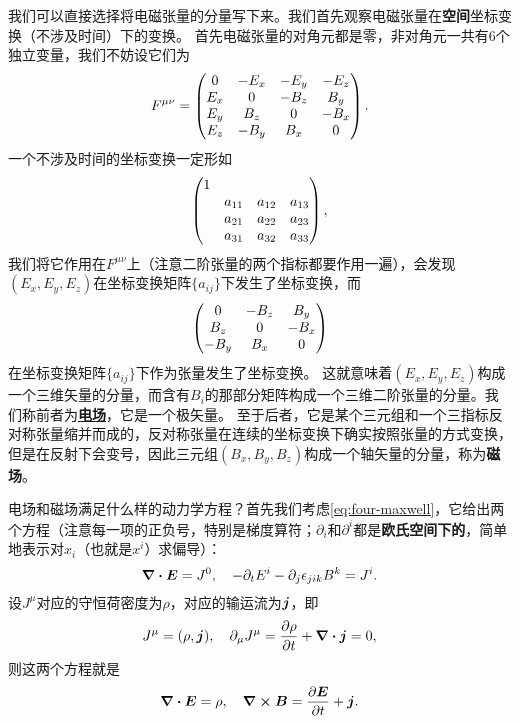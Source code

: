 \documentclass[UTF8, a4paper]{ctexart}
\renewcommand{\emph}[1]{\textbf{#1}}
\newcommand*{\concept}[1]{\underline{\textbf{#1}}}
\begin{document}
我们可以直接选择将电磁张量的分量写下来。我们首先观察电磁张量在\emph{空间}坐标变换（不涉及时间）下的变换。
首先电磁张量的对角元都是零，非对角元一共有$6$个独立变量，我们不妨设它们为
\[
    F^{\mu \nu} = \pmqty{
        0 & -E_x & -E_y & -E_z \\
        E_x & 0 & -B_z & B_y \\
        E_y & B_z & 0 & -B_x \\
        E_z & -B_y & B_x & 0
    }.
\]
一个不涉及时间的坐标变换一定形如
\[
    \pmqty{\dmat{1, \xmat*{a}{3}{3} }},
\]
我们将它作用在$F^{\mu \nu}$上（注意二阶张量的两个指标都要作用一遍），会发现$(E_x, E_y, E_z)$在坐标变换矩阵$\{a_{ij}\}$下发生了坐标变换，而
\[
    \pmqty{
        0 & -B_z & B_y \\
        B_z & 0 & -B_x \\
        -B_y & B_x & 0
    }
\]
在坐标变换矩阵$\{a_{ij}\}$下作为张量发生了坐标变换。
这就意味着$(E_x, E_y, E_z)$构成一个三维矢量的分量，而含有$B_i$的那部分矩阵构成一个三维二阶张量的分量。我们称前者为\concept{电场}，它是一个极矢量。
至于后者，它是某个三元组和一个三指标反对称张量缩并而成的，反对称张量在连续的坐标变换下确实按照张量的方式变换，但是在反射下会变号，因此三元组$(B_x, B_y, B_z)$构成一个轴矢量的分量，称为\textbf{磁场}。

电场和磁场满足什么样的动力学方程？首先我们考虑\eqref{eq:four-maxwell}，它给出两个方程（注意每一项的正负号，特别是梯度算符；$\partial_i$和$\partial^i$都是\emph{欧氏空间下的}，简单地表示对$x_i$（也就是$x^i$）求偏导）：
\[
    \div{\vb*{E}} = J^0, \quad - \partial_t E^i - \partial_j \epsilon_{jik} B^k = J^i.
\]
设$J^\mu$对应的守恒荷密度为$\rho$，对应的输运流为$\vb*{j}$，即
\begin{equation}
    J^\mu = (\rho, \vb*{j}), \quad \partial_\mu J^\mu = \pdv{\rho}{t} + \div{\vb*{j}} = 0,
\end{equation}
则这两个方程就是
\begin{equation}
    \div{\vb*{E}} = \rho, \quad \curl{\vb*{B}} = \pdv{\vb*{E}}{t} + \vb*{j}.
    \label{eq:maxwell-first-pair}
\end{equation}
\end{document}

